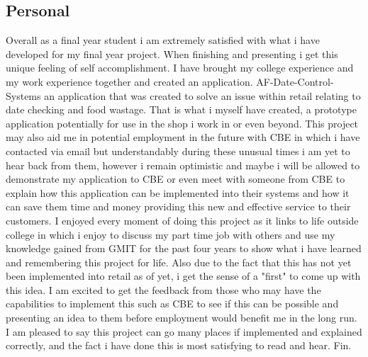 \subsection{Personal}
Overall as a final year student i am extremely satisfied with what i have developed for my final year project. When finishing and presenting i get this unique feeling of self accomplishment. I have brought my college experience and my work experience together and created an application. AF-Date-Control-Systems an application that was created to solve an issue within retail relating to date checking and food wastage. That is what i myself have created, a prototype application potentially for use in the shop i work in or even beyond. 
\newpage
This project may also aid me in potential employment in the future with CBE in which i have contacted via email but understandably during these unusual times i am yet to hear back from them, however i remain optimistic and maybe i will be allowed to demonstrate my application to CBE or even meet with someone from CBE to explain how this application can be implemented into their systems and how it can save them time and money providing this new and effective service to their customers. I enjoyed every moment of doing this project as it links to life outside college in which i enjoy to discuss my part time job with others and use my knowledge gained from GMIT for the past four years to show what i have learned and remembering this project for life. Also due to the fact that this has not yet been implemented into retail as of yet, i get the sense of a "first" to come up with this idea. I am excited to get the feedback from those who may have the capabilities to implement this such as CBE to see if this can be possible and presenting an idea to them before employment would benefit me in the long run. I am pleased to say this project can go many places if implemented and explained correctly, and the fact i have done this is most satisfying to read and hear. Fin.

